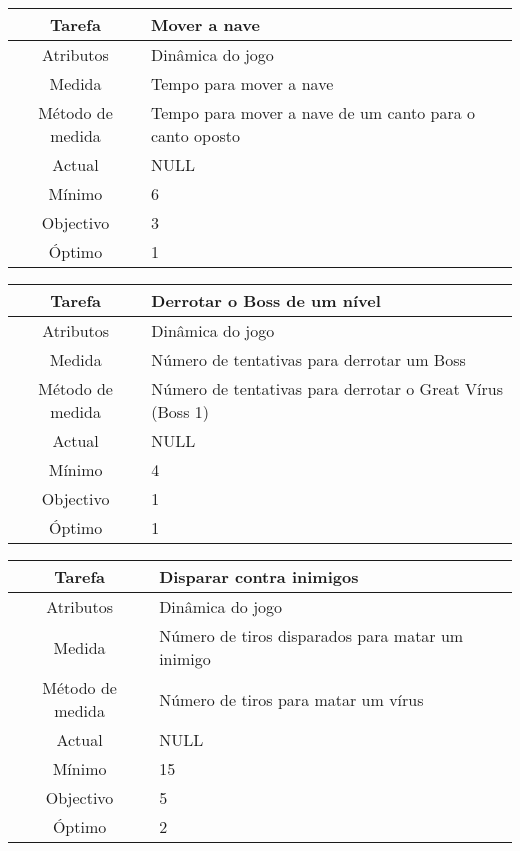 \begin{center}
	\begin{tabular} {|c|p{10cm}|}
		\hline
		Tarefa & Mover a nave \\
		\hline
		Atributos & Dinâmica do jogo \\
		\hline
		Medida & Tempo para mover a nave \\
		\hline
		Método de medida & Tempo para mover a nave de um canto para o canto oposto \\
		\hline
		Actual & NULL \\
		Mínimo & 6 \\
		Objectivo & 3 \\
		Óptimo & 1 \\
		\hline
	\end{tabular}
\end{center}

\begin{center}
	\begin{tabular} {|c|p{10cm}|}
		\hline
		Tarefa & Derrotar o Boss de um nível \\
		\hline
		Atributos & Dinâmica do jogo \\
		\hline
		Medida & Número de tentativas para derrotar um Boss \\
		\hline
		Método de medida & Número de tentativas para derrotar o Great Vírus (Boss 1) \\
		\hline
		Actual & NULL \\
		Mínimo & 4 \\
		Objectivo & 1 \\
		Óptimo & 1 \\
		\hline
	\end{tabular}
\end{center}

\begin{center}
	\begin{tabular} {|c|p{10cm}|}
		\hline
		Tarefa & Disparar contra inimigos \\
		\hline
		Atributos & Dinâmica do jogo \\
		\hline
		Medida & Número de tiros disparados para matar um inimigo \\
		\hline
		Método de medida & Número de tiros para matar um vírus \\
		\hline
		Actual & NULL \\
		Mínimo & 15 \\
		Objectivo & 5 \\
		Óptimo & 2 \\
		\hline
	\end{tabular}
\end{center}

